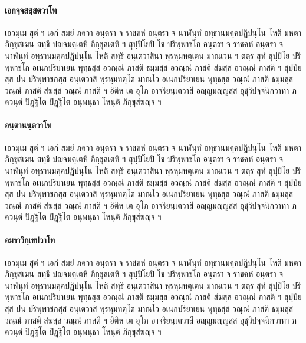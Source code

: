 \documentclass[
]{book}
\begin{document}
\hypertarget{uxe40uxe2duxe01uxe08uxe3auxe08uxe2auxe2auxe3auxe2auxe15uxe27uxe32uxe42uxe17}{%
\paragraph{เอกจฺจสสฺสตวาโท}\label{uxe40uxe2duxe01uxe08uxe3auxe08uxe2auxe2auxe3auxe2auxe15uxe27uxe32uxe42uxe17}}

เอวมฺเม สุตํ ฯ เอกํ สมยํ ภควา อนฺตรา จ ราชคหํ อนฺตรา จ นาฬนฺทํ อทฺธานมคฺคปฏิปนฺโน โหติ มหตา ภิกฺขุสํเฆน สทฺธึ ปญฺจมตฺเตหิ ภิกฺขุสเตหิ ฯ สุปฺปิโยปิ โข ปริพฺพาชโก อนฺตรา จ ราชคหํ อนฺตรา จ นาฬนฺทํ อทฺธานมคฺคปฏิปนฺโน โหติ สทฺธึ อนฺเตวาสินา พฺรหฺมทตฺเตน มาณเวน ฯ ตตฺร สุทํ สุปฺปิโย ปริพฺพาชโก อเนกปริยาเยน พุทฺธสฺส อวณฺณํ ภาสติ ธมฺมสฺส อวณฺณํ ภาสติ สํฆสฺส อวณฺณํ ภาสติ ฯ สุปฺปิยสฺส ปน ปริพฺพาชกสฺส อนฺเตวาสี พฺรหฺมทตฺโต มาณโว อเนกปริยาเยน พุทฺธสฺส วณฺณํ ภาสติ ธมฺมสฺส วณฺณํ ภาสติ สํฆสฺส วณฺณํ ภาสติ ฯ อิติห เต อุโภ อาจริยนฺเตวาสี อญฺญมญฺญสฺส อุชุวิปจฺจนิกวาทา ภควนฺตํ ปิฏฺฐิโต ปิฏฺฐิโต อนุพนฺธา โหนฺติ ภิกฺขุสํฆญฺจ ฯ

\hypertarget{uxe2duxe19uxe3auxe15uxe32uxe19uxe19uxe3auxe15uxe27uxe32uxe42uxe17}{%
\paragraph{อนฺตานนฺตวาโท}\label{uxe2duxe19uxe3auxe15uxe32uxe19uxe19uxe3auxe15uxe27uxe32uxe42uxe17}}

เอวมฺเม สุตํ ฯ เอกํ สมยํ ภควา อนฺตรา จ ราชคหํ อนฺตรา จ นาฬนฺทํ อทฺธานมคฺคปฏิปนฺโน โหติ มหตา ภิกฺขุสํเฆน สทฺธึ ปญฺจมตฺเตหิ ภิกฺขุสเตหิ ฯ สุปฺปิโยปิ โข ปริพฺพาชโก อนฺตรา จ ราชคหํ อนฺตรา จ นาฬนฺทํ อทฺธานมคฺคปฏิปนฺโน โหติ สทฺธึ อนฺเตวาสินา พฺรหฺมทตฺเตน มาณเวน ฯ ตตฺร สุทํ สุปฺปิโย ปริพฺพาชโก อเนกปริยาเยน พุทฺธสฺส อวณฺณํ ภาสติ ธมฺมสฺส อวณฺณํ ภาสติ สํฆสฺส อวณฺณํ ภาสติ ฯ สุปฺปิยสฺส ปน ปริพฺพาชกสฺส อนฺเตวาสี พฺรหฺมทตฺโต มาณโว อเนกปริยาเยน พุทฺธสฺส วณฺณํ ภาสติ ธมฺมสฺส วณฺณํ ภาสติ สํฆสฺส วณฺณํ ภาสติ ฯ อิติห เต อุโภ อาจริยนฺเตวาสี อญฺญมญฺญสฺส อุชุวิปจฺจนิกวาทา ภควนฺตํ ปิฏฺฐิโต ปิฏฺฐิโต อนุพนฺธา โหนฺติ ภิกฺขุสํฆญฺจ ฯ

\hypertarget{uxe2duxe21uxe23uxe32uxe27uxe34uxe01uxe3auxe40uxe02uxe1buxe27uxe32uxe42uxe17}{%
\paragraph{อมราวิกฺเขปวาโท}\label{uxe2duxe21uxe23uxe32uxe27uxe34uxe01uxe3auxe40uxe02uxe1buxe27uxe32uxe42uxe17}}

เอวมฺเม สุตํ ฯ เอกํ สมยํ ภควา อนฺตรา จ ราชคหํ อนฺตรา จ นาฬนฺทํ อทฺธานมคฺคปฏิปนฺโน โหติ มหตา ภิกฺขุสํเฆน สทฺธึ ปญฺจมตฺเตหิ ภิกฺขุสเตหิ ฯ สุปฺปิโยปิ โข ปริพฺพาชโก อนฺตรา จ ราชคหํ อนฺตรา จ นาฬนฺทํ อทฺธานมคฺคปฏิปนฺโน โหติ สทฺธึ อนฺเตวาสินา พฺรหฺมทตฺเตน มาณเวน ฯ ตตฺร สุทํ สุปฺปิโย ปริพฺพาชโก อเนกปริยาเยน พุทฺธสฺส อวณฺณํ ภาสติ ธมฺมสฺส อวณฺณํ ภาสติ สํฆสฺส อวณฺณํ ภาสติ ฯ สุปฺปิยสฺส ปน ปริพฺพาชกสฺส อนฺเตวาสี พฺรหฺมทตฺโต มาณโว อเนกปริยาเยน พุทฺธสฺส วณฺณํ ภาสติ ธมฺมสฺส วณฺณํ ภาสติ สํฆสฺส วณฺณํ ภาสติ ฯ อิติห เต อุโภ อาจริยนฺเตวาสี อญฺญมญฺญสฺส อุชุวิปจฺจนิกวาทา ภควนฺตํ ปิฏฺฐิโต ปิฏฺฐิโต อนุพนฺธา โหนฺติ ภิกฺขุสํฆญฺจ ฯ
\end{document}
